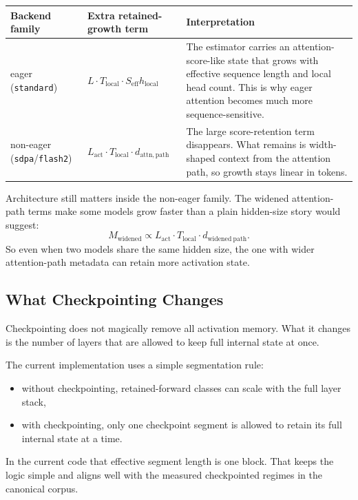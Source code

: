\begin{center}
\small
\begin{tabular}{>{\raggedright\arraybackslash}p{1.0in}>{\raggedright\arraybackslash}p{1.8in}>{\raggedright\arraybackslash}p{2.65in}}
\toprule
Backend family & Extra retained-growth term & Interpretation \\
\midrule
eager (\texttt{standard}) &
$L \cdot T_{\mathrm{local}} \cdot S_{\mathrm{eff}} h_{\mathrm{local}}$ &
The estimator carries an attention-score-like state that grows with effective
sequence length and local head count. This is why eager attention becomes much
more sequence-sensitive. \\
non-eager (\texttt{sdpa}/\texttt{flash2}) &
$L_{\mathrm{act}} \cdot T_{\mathrm{local}} \cdot d_{\mathrm{attn,path}}$ &
The large score-retention term disappears. What remains is width-shaped context
from the attention path, so growth stays linear in tokens. \\
\bottomrule
\end{tabular}
\normalsize
\end{center}

Architecture still matters inside the non-eager family. The widened
attention-path terms make some models grow faster than a plain hidden-size
story would suggest:
\[
M_{\mathrm{widened}}
\propto
L_{\mathrm{act}} \cdot T_{\mathrm{local}} \cdot d_{\mathrm{widened\ path}}.
\]
So even when two models share the same hidden size, the one with wider
attention-path metadata can retain more activation state.

\subsection{What Checkpointing Changes}
Checkpointing does not magically remove all activation memory. What it changes
is the number of layers that are allowed to keep full internal state at once.

The current implementation uses a simple segmentation rule:
\begin{itemize}[leftmargin=1.5em]
\item without checkpointing, retained-forward classes can scale with the full
layer stack,
\item with checkpointing, only one checkpoint segment is allowed to retain its
full internal state at a time.
\end{itemize}

In the current code that effective segment length is one block. That keeps the
logic simple and aligns well with the measured checkpointed regimes in the
canonical corpus.

